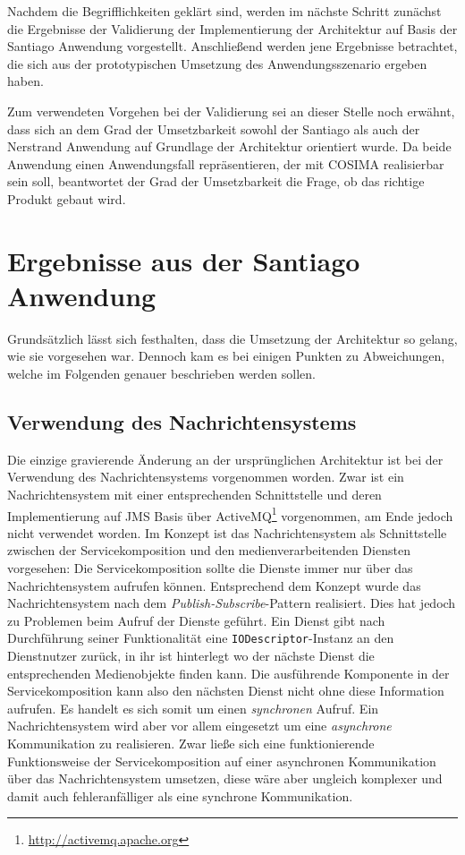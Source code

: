   Nachdem die Begrifflichkeiten geklärt sind, werden im nächste Schritt zunächst die Ergebnisse der Validierung der Implementierung der Architektur auf Basis der Santiago Anwendung vorgestellt. Anschließend werden jene Ergebnisse betrachtet, die sich aus der prototypischen Umsetzung des Anwendungsszenario ergeben haben.
  
  Zum verwendeten Vorgehen bei der Validierung sei an dieser Stelle noch erwähnt, dass sich an dem Grad der Umsetzbarkeit sowohl der Santiago als auch der Nerstrand Anwendung auf Grundlage der Architektur orientiert wurde. Da beide Anwendung einen Anwendungsfall repräsentieren, der mit COSIMA realisierbar sein soll, beantwortet der Grad der Umsetzbarkeit die Frage, ob das richtige Produkt gebaut wird.
  

\section{Ergebnisse aus der Santiago Anwendung} %
\label{sec:ergebnisse_aus_der_santiago_anwendung}

  Grundsätzlich lässt sich festhalten, dass die Umsetzung der Architektur so gelang, wie sie vorgesehen war. Dennoch kam es bei einigen Punkten zu Abweichungen, welche im Folgenden genauer beschrieben werden sollen.
  
\subsection{Verwendung des Nachrichtensystems} %
\label{sub:verwendung_des_nachrichtensystems}

  Die einzige gravierende Änderung an der ursprünglichen Architektur ist bei der Verwendung des Nachrichtensystems vorgenommen worden. Zwar ist ein Nachrichtensystem mit einer entsprechenden Schnittstelle und deren Implementierung auf JMS Basis über \mbox{ActiveMQ}\footnote{\url{http://activemq.apache.org}} vorgenommen, am Ende jedoch nicht verwendet worden. Im Konzept ist das Nachrichtensystem als Schnittstelle zwischen der Servicekomposition und den medienverarbeitenden Diensten vorgesehen: Die Servicekomposition sollte die Dienste immer nur über das Nachrichtensystem aufrufen können. Entsprechend dem Konzept wurde das Nachrichtensystem nach dem \emph{Publish-Subscribe}-Pattern realisiert. Dies hat jedoch zu Problemen beim Aufruf der Dienste geführt. Ein Dienst gibt nach Durchführung seiner Funktionalität eine \verb!IODescriptor!-Instanz an den Dienstnutzer zurück, in ihr ist hinterlegt wo der nächste Dienst die entsprechenden Medienobjekte finden kann. Die ausführende Komponente in der Servicekomposition kann also den nächsten Dienst nicht ohne diese Information aufrufen. Es handelt es sich somit um einen \emph{synchronen} Aufruf. Ein Nachrichtensystem wird aber vor allem eingesetzt um eine \emph{asynchrone} Kommunikation zu realisieren. Zwar ließe sich eine funktionierende Funktionsweise der Servicekomposition auf einer asynchronen Kommunikation über das Nachrichtensystem umsetzen, diese wäre aber ungleich komplexer und damit auch fehleranfälliger als eine synchrone Kommunikation.
  
